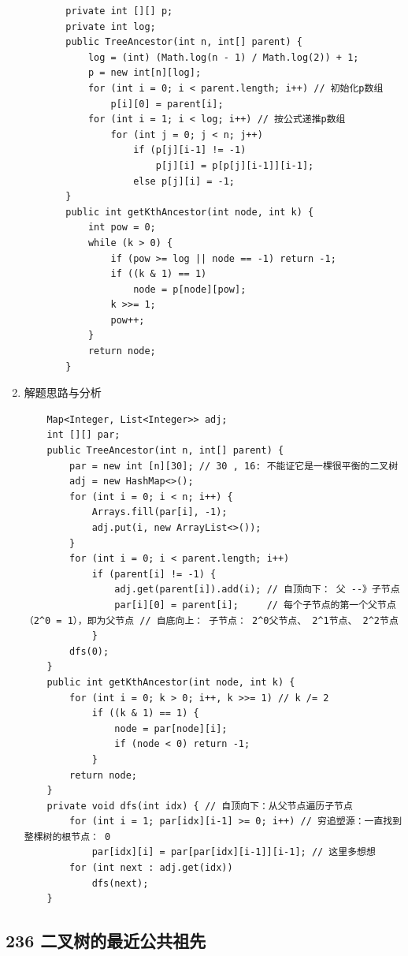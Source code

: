 \documentclass[9pt, b5paaper]{book}
\begin{document}
\begin{enumerate}
\begin{itemize}
\begin{verbatim}
    private int [][] p;
    private int log;
    public TreeAncestor(int n, int[] parent) {
        log = (int) (Math.log(n - 1) / Math.log(2)) + 1;
        p = new int[n][log];
        for (int i = 0; i < parent.length; i++) // 初始化p数组
            p[i][0] = parent[i];
        for (int i = 1; i < log; i++) // 按公式递推p数组
            for (int j = 0; j < n; j++) 
                if (p[j][i-1] != -1) 
                    p[j][i] = p[p[j][i-1]][i-1];
                else p[j][i] = -1;
    }
    public int getKthAncestor(int node, int k) {
        int pow = 0;
        while (k > 0) {
            if (pow >= log || node == -1) return -1;
            if ((k & 1) == 1) 
                node = p[node][pow];
            k >>= 1;
            pow++;
        }
        return node;
    }
\end{verbatim}
\end{itemize}
\item 解题思路与分析
\label{sec-1-1-6-2}
\begin{verbatim}
    Map<Integer, List<Integer>> adj;
    int [][] par;
    public TreeAncestor(int n, int[] parent) {
        par = new int [n][30]; // 30 , 16: 不能证它是一棵很平衡的二叉树
        adj = new HashMap<>();
        for (int i = 0; i < n; i++) {
            Arrays.fill(par[i], -1);
            adj.put(i, new ArrayList<>());
        }
        for (int i = 0; i < parent.length; i++) 
            if (parent[i] != -1) {
                adj.get(parent[i]).add(i); // 自顶向下： 父 --》子节点
                par[i][0] = parent[i];     // 每个子节点的第一个父节点（2^0 = 1），即为父节点 // 自底向上： 子节点： 2^0父节点、 2^1节点、 2^2节点
            }
        dfs(0);
    }
    public int getKthAncestor(int node, int k) {
        for (int i = 0; k > 0; i++, k >>= 1) // k /= 2
            if ((k & 1) == 1) {
                node = par[node][i];
                if (node < 0) return -1;
            }
        return node;
    }
    private void dfs(int idx) { // 自顶向下：从父节点遍历子节点
        for (int i = 1; par[idx][i-1] >= 0; i++) // 穷追塑源：一直找到整棵树的根节点： 0
            par[idx][i] = par[par[idx][i-1]][i-1]; // 这里多想想
        for (int next : adj.get(idx)) 
            dfs(next);
    }
\end{verbatim}
\end{enumerate}
\subsection{236 二叉树的最近公共祖先}
\label{sec-1-1-7}
\end{document}
